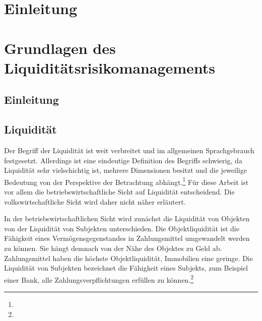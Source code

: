 

\begin{onehalfspacing}

\chapter{Einleitung}

\chapter{Grundlagen des Liquiditätsrisikomanagements}

\section{Einleitung}

\section{Liquidität}

Der Begriff der Liquidität ist weit verbreitet und im allgemeinen Sprachgebrauch festgesetzt. Allerdings ist eine eindeutige Definition des Begriffs schwierig, da Liquidität sehr vielschichtig ist, mehrere Dimensionen besitzt und die jeweilige Bedeutung von der Perspektive der Betrachtung abhängt.\footnote{ } Für diese Arbeit ist vor allem die betriebswirtschaftliche Sicht auf Liquidität entscheidend. Die volkswirtschaftliche Sicht wird daher nicht näher erläutert.

In der betriebswirtschaftlichen Sicht wird zunächst die Liquidität von Objekten von der Liquidität von Subjekten unterschieden. Die Objektliquidität ist die Fähigkeit eines Vermögensgegenstandes in Zahlungsmittel umgewandelt werden zu können. Sie hängt demnach von der Nähe des Objektes zu Geld ab. Zahlungsmittel haben die höchste Objektliquidität, Immobilien eine geringe. Die Liquidität von Subjekten bezeichnet die Fähigkeit eines Subjekts, zum Beispiel einer Bank, alle Zahlungsverpflichtungen erfüllen zu können.\footnote{ }


\end{onehalfspacing}
